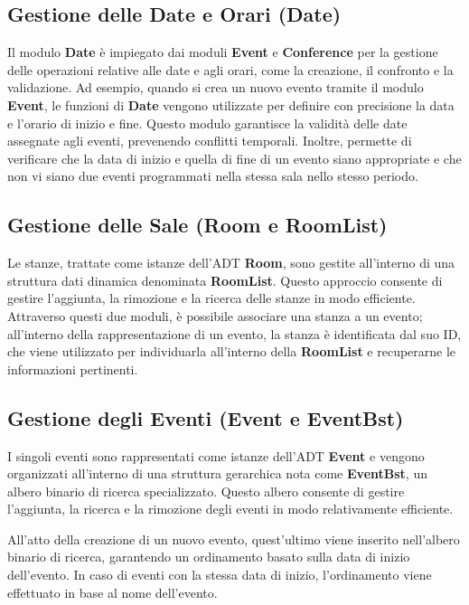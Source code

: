 \documentclass[11pt]{scrartcl} %
\begin{document}
\subsection{Gestione delle Date e Orari (Date)}
Il modulo \textbf{Date} è impiegato dai moduli \textbf{Event} e \textbf{Conference} per la gestione delle operazioni relative alle date e agli orari, come la creazione, il confronto e la validazione. Ad esempio, quando si crea un nuovo evento tramite il modulo \textbf{Event}, le funzioni di \textbf{Date} vengono utilizzate per definire con precisione la data e l'orario di inizio e fine. Questo modulo garantisce la validità delle date assegnate agli eventi, prevenendo conflitti temporali. Inoltre, permette di verificare che la data di inizio e quella di fine di un evento siano appropriate e che non vi siano due eventi programmati nella stessa sala nello stesso periodo.


\subsection{Gestione delle Sale (Room e RoomList)}
Le stanze, trattate come istanze dell'ADT \textbf{Room}, sono gestite all'interno di una struttura dati dinamica denominata \textbf{RoomList}. Questo approccio consente di gestire l'aggiunta, la rimozione e la ricerca delle stanze in modo efficiente. Attraverso questi due moduli, è possibile associare una stanza a un evento; all'interno della rappresentazione di un evento, la stanza è identificata dal suo ID, che viene utilizzato per individuarla all'interno della \textbf{RoomList} e recuperarne le informazioni pertinenti.

\subsection{Gestione degli Eventi (Event e EventBst)}

I singoli eventi sono rappresentati come istanze dell'ADT \textbf{Event} e vengono organizzati all'interno di una struttura gerarchica nota come \textbf{EventBst}, un albero binario di ricerca specializzato. Questo albero consente di gestire l'aggiunta, la ricerca e la rimozione degli eventi in modo relativamente efficiente.

All'atto della creazione di un nuovo evento, quest'ultimo viene inserito nell'albero binario di ricerca, garantendo un ordinamento basato sulla data di inizio dell'evento. In caso di eventi con la stessa data di inizio, l'ordinamento viene effettuato in base al nome dell'evento.
\end{document}
